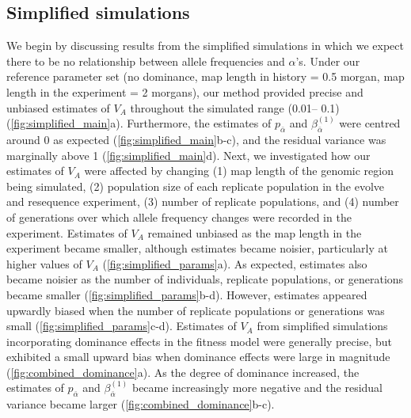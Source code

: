 \documentclass[12pt]{article}
\begin{document}
\begin{bibunit}
\subsection*{Simplified simulations}

We begin by discussing results from the simplified simulations in which we expect there to be no relationship between allele frequencies and $\alpha$'s. Under our reference parameter set (no dominance, map length in history = 0.5 morgan, map length in the experiment = 2 morgans), our method provided precise and unbiased estimates of $V_A$ throughout the simulated range (0.01-- 0.1) (\ref{fig:simplified_main}a). Furthermore, the estimates of $p_{\bar \alpha} $ and $\beta^{(1)}_{\bar{\alpha}}$ were centred around 0 as expected (\ref{fig:simplified_main}b-c), and the residual variance was marginally above 1 (\ref{fig:simplified_main}d). Next, we investigated how our estimates of $V_A$ were affected by changing (1) map length of the genomic region being simulated, (2) population size of each replicate population in the evolve and resequence experiment, (3) number of replicate populations, and (4) number of generations over which allele frequency changes were recorded in the experiment. Estimates of $V_A$ remained unbiased as the map length in the experiment became smaller, although estimates became noisier, particularly at higher values of $V_A$ (\ref{fig:simplified_params}a).  As expected, estimates also became noisier as the number of individuals, replicate populations, or generations became smaller (\ref{fig:simplified_params}b-d). However, estimates appeared upwardly biased when the number of replicate populations or generations was small (\ref{fig:simplified_params}c-d). Estimates of $V_A$ from simplified simulations incorporating dominance effects in the fitness model were generally precise, but exhibited a small upward bias when dominance effects were large in magnitude (\ref{fig:combined_dominance}a). As the degree of dominance increased, the estimates of $p_{\bar \alpha} $ and $\beta^{(1)}_{\bar{\alpha}}$ became increasingly more negative and the residual variance became larger (\ref{fig:combined_dominance}b-c). 


\end{bibunit}
\end{document}

